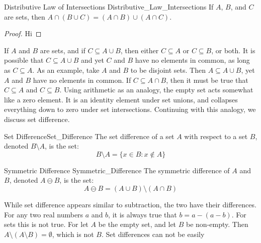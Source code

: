         \begin{ltheorem}{Distributive Law of Intersections}
              {Distributive_Law_Intersections}
            If $A$, $B$, and $C$ are sets, then
            $A\cap(B\cup{C})=(A\cap{B})\cup(A\cap{C})$.
        \end{ltheorem}
        \begin{proof}
            Hi
        \end{proof}
        If $A$ and $B$ are sets, and if
        $C\subseteq{A}\cup{B}$, then
        either $C\subseteq{A}$ or $C\subseteq{B}$, or both.
        It is possible that $C\subseteq{A}\cup{B}$ and yet
        $C$ and $B$ have no elements in common, as long
        as $C\subseteq{A}$. As an example,
        take $A$ and $B$ to be disjoint sets. Then
        $A\subseteq{A}\cup{B}$, yet $A$ and $B$ have no
        elements in common. If $C\subseteq{A}\cap{B}$, then
        it must be true that $C\subseteq{A}$ and
        $C\subseteq{B}$.
        Using arithmetic as an analogy, the empty set
        acts somewhat like a zero element. It is an identity
        element under set unions, and collapses everything
        down to zero under set intersections. Continuing
        with this analogy, we discuss set difference.
        \begin{ldefinition}{Set Difference}{Set_Difference}
            The set difference of a set $A$ with respect to
            a set $B$, denoted $B\setminus{A}$, is the set:
            \begin{equation}
                B\setminus{A}=\{x\in{B}:x\notin{A}\}
            \end{equation}
        \end{ldefinition}
        \begin{ldefinition}{Symmetric Difference}
              {Symmetric_Difference}
            The symmetric difference of $A$ and $B$, denoted
            $A\ominus{B}$, is the set:
            \begin{equation}
                A\ominus{B}
                =(A\cup{B})\setminus(A\cap{B})
            \end{equation}
        \end{ldefinition}
        While set difference appears similar to subtraction,
        the two have their differences. For any two real
        numbers $a$ and $b$, it is always true that
        $b=a-(a-b)$. For sets this is not true. For let $A$
        be the empty set, and let $B$ be non-empty.
        Then $A\setminus(A\setminus{B})=\emptyset$, which
        is not $B$. Set differences can not be easily
